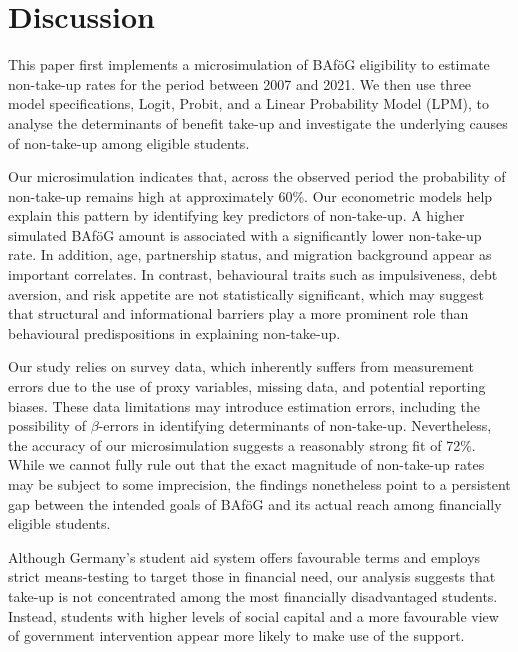 \section{Discussion}



This paper first implements a microsimulation of BAföG eligibility to estimate non-take-up rates for the period between 2007 and 2021. 
We then use three model specifications, Logit, Probit, and a Linear Probability Model (LPM), to analyse the determinants of benefit take-up and investigate the underlying causes of non-take-up among eligible students. 

Our microsimulation indicates that, across the observed period the probability of non-take-up remains high at approximately 60\%.
Our econometric models help explain this pattern by identifying key predictors of non-take-up. 
A higher simulated BAföG amount is associated with a significantly lower non-take-up rate. 
In addition, age, partnership status, and migration background appear as important correlates.
In contrast, behavioural traits such as impulsiveness, debt aversion, and risk appetite are not statistically significant, which may suggest that structural and informational barriers play a more prominent role than behavioural predispositions in explaining non-take-up.

Our study relies on survey data, which inherently suffers from measurement errors due to the use of proxy variables, missing data, and potential reporting biases. 
These data limitations may introduce estimation errors, including the possibility of \( \beta \)-errors in identifying determinants of non-take-up. 
Nevertheless, the accuracy of our microsimulation suggests a reasonably strong fit of 72\%.
While we cannot fully rule out that the exact magnitude of non-take-up rates may be subject to some imprecision, the findings nonetheless point to a persistent gap between the intended goals of BAföG and its actual reach among financially eligible students.

Although Germany’s student aid system offers favourable terms and employs strict means-testing to target those in financial need, our analysis suggests that take-up is not concentrated among the most financially disadvantaged students. 
Instead, students with higher levels of social capital and a more favourable view of government intervention appear more likely to make use of the support.

